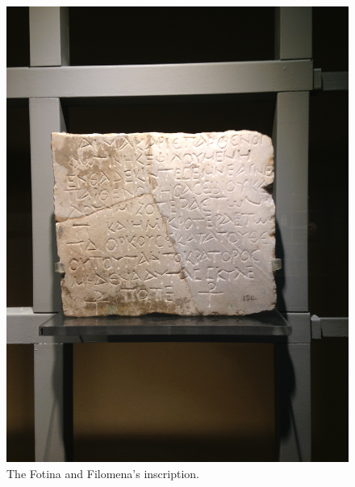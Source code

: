 \documentclass[amsthm,ebook]{saparticle}
\begin{document}
\begin{figure}[hbp]
\centering
 \includegraphics[width=\columnwidth]{FotinaeFilomena.JPG}
\caption{The Fotina and Filomena’s inscription.}
\label{fig:4}
\end{figure}
\end{document}
